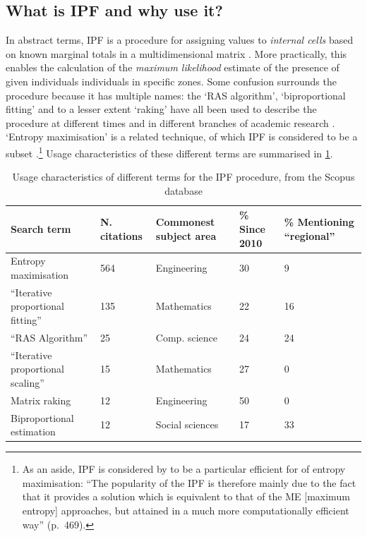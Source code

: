 \documentclass[a4paper,10pt]{article}
\begin{document}
\subsection{What is IPF and why use it?} 
\label{swhatis}

In abstract terms, IPF is a procedure for assigning values to \emph{internal cells}
based on known marginal totals in a multidimensional matrix \citep{Cleave1995}.
More practically, this enables the calculation of the
\emph{maximum likelihood} estimate of the presence of
given individuals individuals in specific zones.
Some confusion surrounds the procedure because it has multiple names:
the `RAS algorithm', `biproportional fitting' and to a lesser extent
`raking' have all been used to describe the procedure
at different times and in different branches of academic research \citep{Lahr2004}.
`Entropy maximisation' is a related technique, of which IPF is considered to be a
subset \citep{Johnston1993,Rich2012}.\footnote{As an
aside, IPF is considered by \citet{Rich2012} to be a particular
efficient for of entropy maximisation: ``The popularity of the IPF is therefore mainly due to the fact that it provides a
solution which is equivalent to that of the ME [maximum entropy]
approaches, but attained in a much more
computationally efficient way'' (p.~469).
}
Usage characteristics of these different terms are summarised in \cref{tterms}.

\begin{table}[htbp]
\caption{Usage characteristics of different terms for the IPF procedure, from the Scopus database}
\begin{tabular}{lp{1.5cm}p{2.5cm}p{1.5cm}p{2.5cm}}
\toprule
Search term & N. citations & Commonest subject area & \% Since 2010 & \% Mentioning ``regional'' \\
\midrule
Entropy maximisation & 564 & Engineering & 30 & 9 \\
``Iterative proportional fitting''  & 135 & Mathematics & 22\ & 16 \\
``RAS Algorithm'' & 25 & Comp. science & 24 & 24 \\
``Iterative proportional scaling'' & 15 & Mathematics & 27 & 0 \\
Matrix raking & 12 & Engineering & 50 & 0 \\
Biproportional estimation & 12 & Social sciences & 17 & 33 \\
\bottomrule
\end{tabular}
\label{tterms}
\end{table}
\end{document}
